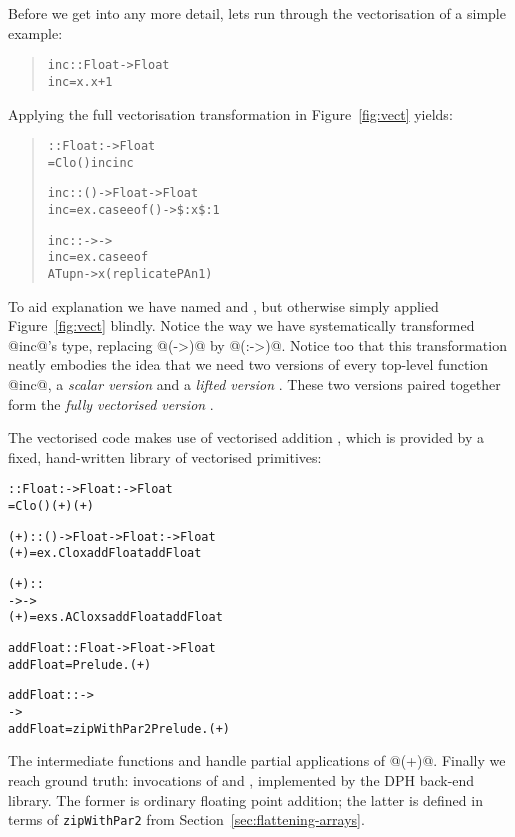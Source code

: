 Before we get into any more detail, lets run through the vectorisation of a simple example:
%
\begin{quote}
\begin{alltt}
inc :: Float -> Float
inc = \hslam{}x. x + 1
\end{alltt}
\end{quote}
%
Applying the full vectorisation transformation in Figure~\ref{fig:vect} yields:
%
\begin{quote}
\begin{alltt}
 :: Float :-> Float
 = Clo () inc inc

inc :: () -> Float -> Float
inc = \hslam{}e x. case e of () -> \VV{(+)} \$: x \$: 1 

inc :: \pa{()} ->  -> 
inc = \hslam{}e x. case e of 
  ATup n -> \VV{(+)} \LV{\$:} x \LV{\$:} (replicatePA n 1)
\end{alltt}
\end{quote}
%
To aid explanation we have named  and , but otherwise simply applied Figure~\ref{fig:vect} blindly. Notice the way we have systematically transformed @inc@'s type, replacing @(->)@ by @(:->)@.  Notice too that this transformation neatly embodies the idea that we need two versions of every top-level function @inc@, a \emph{scalar version}  and a \emph{lifted version} .  These two versions paired together form the \emph{fully vectorised version} .

The vectorised code makes use of vectorised addition , which is provided by a fixed, hand-written library of vectorised primitives:
%
\begin{alltt}
  \VV{(+)} :: Float :-> Float :-> Float
  \VV{(+)} = Clo () (+) (+)

  (+) :: () -> Float -> Float :-> Float
  (+) = \hslam{}e x. Clo x addFloat addFloat

  (+) :: \pa{()} 
       ->  -> 
  (+) = \hslam{}e xs. AClo xs addFloat addFloat

  addFloat :: Float -> Float -> Float
  addFloat = Prelude.(+)

  addFloat ::  ->  
            -> 
  addFloat = zipWithPar2 Prelude.(+)
\end{alltt}
%
The intermediate functions  and  handle partial applications of @(+)@.  Finally we reach ground truth: invocations of  and , implemented by the DPH back-end library. The former is ordinary floating point addition; the latter is  defined in terms of \texttt{zipWithPar2} from Section~\ref{sec:flattening-arrays}.

